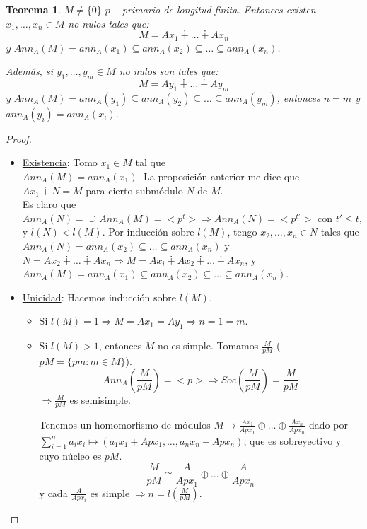 \documentclass[11pt,a4paper]{article}
\theoremstyle{break}
\newtheorem{theorem}{Teorema}[section]
\begin{document}
\begin{theorem}
$M \neq \{0\}$ $p-$primario de longitud finita. Entonces existen $x_{1}, \dots, x_{n} \in M$ no nulos tales que:
$$M = Ax_{1} \dotplus \dots \dotplus Ax_{n}$$
y $Ann_{A}(M) = ann_{A}(x_{1}) \subseteq ann_{A}(x_{2}) \subseteq \dots \subseteq ann_{A}(x_{n})$.

Además, si $y_{1}, \dots, y_{m} \in M$ no nulos son tales que:
$$M = Ay_{1} \dotplus \dots \dotplus Ay_{m}$$
y $Ann_{A}(M) = ann_{A}(y_{1}) \subseteq ann_{A}(y_{2}) \subseteq \dots \subseteq ann_{A}(y_{m})$, entonces $n = m$ y $ann_{A}(y_{i}) = ann_{A}(x_{i})$.
\end{theorem}

\begin{proof}
\begin{itemize}
\item \underline{Existencia}: Tomo $x_{1} \in M$ tal que \\ $Ann_{A}(M) = ann_{A}(x_{1})$. La proposición anterior me dice que $Ax_{1} \dotplus N = M$ para cierto submódulo $N$ de $M$. \\
Es claro que $Ann_{A}(N) = \supseteq Ann_{A}(M) = <p^{t}> \Rightarrow Ann_{A}(N) = <p^{t'}>$ con $t' \leq t$, y $l(N) < l(M)$. Por inducción sobre $l(M)$, tengo $x_{2}, \dots, x_{n} \in N$ tales que $Ann_{A}(N) = ann_{A}(x_{2}) \subseteq \dots \subseteq ann_{A}(x_{n})$ y $N = Ax_{2} \dotplus \dots \dotplus Ax_{n} \Rightarrow M = Ax_{i} \dotplus Ax_{2} \dotplus \dots \dotplus Ax_{n}$, y $Ann_{A}(M) = ann_{A}(x_{1}) \subseteq ann_{A}(x_{2}) \subseteq \dots \subseteq ann_{A}(x_{n})$.
\item \underline{Unicidad}: Hacemos inducción sobre $l(M)$.
\begin{itemize}
\item Si $l(M) = 1 \Rightarrow M = Ax_{1} = Ay_{1} \Rightarrow n = 1 = m$.
\item Si $l(M) > 1$, entonces $M$ no es simple. Tomamos $\frac{M}{pM}$ ($pM = \{pm: m \in M\}$). 
$$Ann_{A}(\frac{M}{pM}) = <p>\Rightarrow Soc(\frac{M}{pM}) = \frac{M}{pM}$$
$\Rightarrow \frac{M}{pM}$ es semisimple.

Tenemos un homomorfismo de módulos $M \to \frac{Ax_{1}}{Apx_{1}} \oplus \dots \oplus \frac{Ax_{n}}{Apx_{n}}$ dado por $\sum_{i=1}^{n} a_{i} x_{i} \mapsto (a_{1}x_{1} + Apx_{1}, \dots, a_{n} x_{n} + Apx_{n})$, que es sobreyectivo y cuyo núcleo es $pM$.
$$\frac{M}{pM} \cong \frac{A}{Apx_{1}} \oplus \dots \oplus \frac{A}{Apx_{n}}$$
y cada $\frac{A}{Apx_{i}}$ es simple $\Rightarrow n = l(\frac{M}{pM})$.


\end{itemize}
\end{itemize}
\end{proof}
\end{document}
